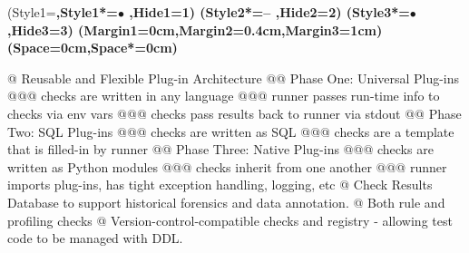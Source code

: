 \documentclass[12pt]{article} %
\begin{document}
\begin{minipage}[t]{.66\linewidth} %


\NewList
\ListProperties(Style1=\bfseries,Style1*=$\bullet$ ,Hide1=1)
\ListProperties(Style2*=-- ,Hide2=2)
\ListProperties(Style3*=$\bullet$ ,Hide3=3)
\ListProperties(Margin1=0cm,Margin2=0.4cm,Margin3=1cm)
\ListProperties(Space=0cm,Space*=0cm)
\begin{easylist}
    @ Reusable and Flexible Plug-in Architecture
    @@ Phase One: Universal Plug-ins
    @@@ checks are written in any language
    @@@ runner passes run-time info to checks via env vars
    @@@ checks pass results back to runner via stdout
    @@ Phase Two: SQL Plug-ins
    @@@ checks are written as SQL
    @@@ checks are a template that is filled-in by runner
    @@ Phase Three: Native Plug-ins
    @@@ checks are written as Python modules
    @@@ checks inherit from one another
    @@@ runner imports plug-ins, has tight exception handling, logging, etc
    @ Check Results Database to support historical forensics and data annotation.
    @ Both rule and profiling checks
    @ Version-control-compatible checks and registry - allowing test code to be managed with DDL.
\end{easylist}



\end{minipage}
\end{document}
